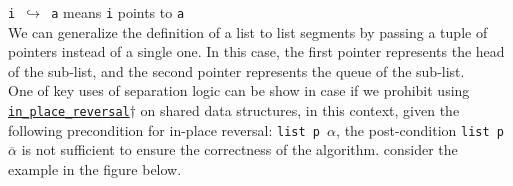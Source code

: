 \documentclass[11pt,a4paper]{article}
\begin{document}
\texttt{i $\hookrightarrow$ a} means \texttt{i} points to \texttt{a}\\

We can generalize the definition of a list to list segments by passing a tuple of pointers instead of a single one. In this case, the first pointer represents the head of the sub-list, and the second pointer represents the queue of the sub-list.\\
One of key uses of separation logic can be show in case if we prohibit using \hyperlink{reversal}{\texttt{in\_place\_reversal}$\dagger$} on shared data structures, in this context, given the following precondition for in-place reversal: \texttt{list p $\alpha$}, the post-condition \texttt{list p }$\overline{\alpha}$ is not sufficient to ensure the correctness of the algorithm. consider the example in the figure below.
\end{document}
